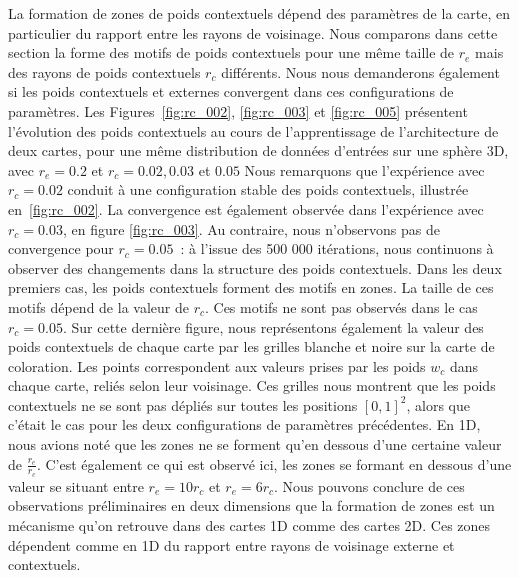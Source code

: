 \documentclass[../main]{subfiles}
\begin{document}
La formation de zones de poids contextuels dépend des paramètres de la carte, en particulier du rapport entre les rayons de voisinage.
Nous comparons dans cette section la forme des motifs de poids contextuels pour une même taille de $r_e$ mais des rayons de poids contextuels $r_c$ différents.
Nous nous demanderons également si les poids contextuels et externes convergent dans ces configurations de paramètres.
Les Figures~\ref{fig:rc_002}, \ref{fig:rc_003} et \ref{fig:rc_005} présentent l'évolution des poids contextuels au cours de l'apprentissage de l'architecture de deux cartes, pour une même distribution de données d'entrées sur une sphère 3D, avec $r_e = 0.2$ et $r_c = 0.02, 0.03$ et $0.05$
Nous remarquons que l'expérience avec $r_c = 0.02$ conduit à une configuration stable des poids contextuels, illustrée en~\ref{fig:rc_002}. 
La convergence est également observée dans l'expérience avec $r_c = 0.03$, en figure \ref{fig:rc_003}. Au contraire, nous n'observons pas de convergence pour $r_c =0.05$~: à l'issue des 500 000 itérations, nous continuons à observer des changements dans la structure des poids contextuels. 
Dans les deux premiers cas, les poids contextuels forment des motifs en zones. La taille de ces motifs dépend de la valeur de $r_c$. Ces motifs ne sont pas observés dans le cas $r_c = 0.05$. 
Sur cette dernière figure, nous représentons également la valeur des poids contextuels de chaque carte par les grilles blanche et noire sur la carte de coloration. Les points  correspondent aux valeurs prises par les poids $w_c$ dans chaque carte, reliés selon leur voisinage.
Ces grilles nous montrent que les poids contextuels ne se sont pas dépliés sur toutes les positions $[0,1]^2$, alors que c'était le cas pour les deux configurations de paramètres précédentes.
En 1D, nous avions noté que les zones ne se forment qu'en dessous d'une certaine valeur de $\frac{r_e}{r_c}$.
C'est également ce qui est observé ici, les zones se formant en dessous d'une valeur se situant entre $r_e = 10 r_c$ et $r_e = 6 r_c$.
Nous pouvons conclure de ces observations préliminaires en deux dimensions que la formation de zones est un mécanisme qu'on retrouve dans des cartes 1D comme des cartes 2D. Ces zones dépendent comme en 1D du rapport entre rayons de voisinage externe et contextuels.
\end{document}
